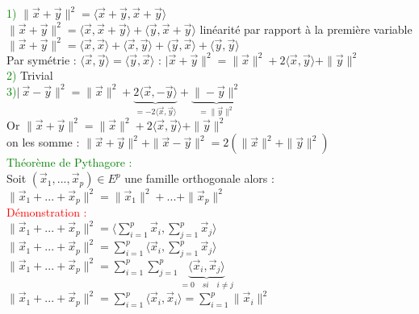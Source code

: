 \documentclass{article}
\begin{document}
\textcolor{green}{1)} $\| \vec x + \vec y \|^2= \langle \vec x + \vec y, \vec x + \vec y \rangle$ \\
$\| \vec x + \vec y \|^2= \langle \vec x, \vec x + \vec y \rangle+\langle \vec y, \vec x + \vec y \rangle$ linéarité par rapport à la première variable \\
$\| \vec x + \vec y \|^2= \langle \vec x, \vec x \rangle+ \langle \vec x, \vec y \rangle +\langle \vec y, \vec x \rangle + \langle \vec y, \vec y \rangle$ \\
Par symétrie : $\langle \vec x, \vec y \rangle =\langle \vec y, \vec x \rangle$ : $| \vec x + \vec y \|^2= \| \vec x \|^2 +2 \langle \vec x, \vec y \rangle + \| \vec y \|^2 $ \\
\textcolor{green}{2)} Trivial \\
\textcolor{green}{3)}$|\ \vec x - \vec y \|^2= \| \vec x \|^2 + \underbrace{2 \langle \vec x, - \vec y \rangle}_{=-2 \langle \vec x, \vec y \rangle} + \underbrace{\| - \vec y \|^2}_{=\| \vec y \|^2}$  \\
Or $\| \vec x +\vec y \|^2= \| \vec x \|^2 + 2 \langle \vec x , \vec y \rangle + \| \vec y \|^2$ \\
on les somme : $\| \vec x+ \vec y \|^2 + \| \vec x - \vec y \|^2= 2 (\|\vec x \|^2 + \| \vec y \|^2)$ \\
\textcolor{green}{Théorème de Pythagore :} \\
Soit $(\vec x_1,...,\vec x_p) \in E^p$ une famille orthogonale alors : \\
$\| \vec x_1 +...+ \vec x_p \|^2= \| \vec x_1 \|^2 + ... + \| \vec x_p\|^2$ \\
\textcolor{red}{Démonstration :} \\
$\| \vec x_1 +...+ \vec x_p \|^2= \langle \sum_{i=1}^p \vec x_i, \sum_{j=1}^p \vec x_j \rangle$ \\
$\| \vec x_1 +...+ \vec x_p \|^2= \sum_{i=1}^p \langle \vec x_i, \sum_{j=1}^p \vec x_j \rangle$ \\
$\| \vec x_1 +...+ \vec x_p \|^2= \sum_{i=1}^p \sum_{j=1}^p \underbrace{\langle \vec x_i , \vec x_j \rangle}_{=0 \quad si \quad i \neq j}$ \\
$\| \vec x_1 +...+ \vec x_p \|^2=\sum_{i=1}^p \langle \vec x_i, \vec x_i \rangle =\sum_{i=1}^p \| \vec x_i \|^2$
\end{document}
